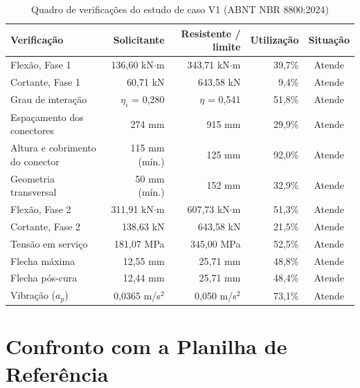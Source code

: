 \begin{table}[htbp]
  \centering
  \caption{Quadro de verificações do estudo de caso V1 (ABNT NBR 8800:2024)}\label{tab:quadro-v1}
  {\small
  \begin{tabular}{@{}lrrrc@{}}
  \toprule
  Verificação & Solicitante & Resistente / limite & Utilização & Situação \\
  \midrule
  Flexão, Fase 1 & 136,60 kN\ensuremath{\cdot}m & 343,71 kN\ensuremath{\cdot}m & 39,7\% & Atende \\
  Cortante, Fase 1 & 60,71 kN & 643,58 kN & 9,4\% & Atende \\
  Grau de interação & $\eta_i$ = 0,280 & $\eta$ = 0,541 & 51,8\% & Atende \\
  Espaçamento dos conectores & 274 mm & 915 mm & 29,9\% & Atende \\
  Altura e cobrimento do conector & 115 mm (mín.) & 125 mm & 92,0\% & Atende \\
  Geometria transversal & 50 mm (mín.) & 152 mm & 32,9\% & Atende \\
  Flexão, Fase 2 & 311,91 kN\ensuremath{\cdot}m & 607,73 kN\ensuremath{\cdot}m & 51,3\% & Atende \\
  Cortante, Fase 2 & 138,63 kN & 643,58 kN & 21,5\% & Atende \\
  Tensão em serviço & 181,07 MPa & 345,00 MPa & 52,5\% & Atende \\
  Flecha máxima & 12,55 mm & 25,71 mm & 48,8\% & Atende \\
  Flecha pós-cura & 12,44 mm & 25,71 mm & 48,4\% & Atende \\
  Vibração ($a_p$) & 0,0365 m/s\ensuremath{^2} & 0,050 m/s\ensuremath{^2} & 73,1\% & Atende \\
  \bottomrule
  \end{tabular}
  }
\end{table}

\section{Confronto com a Planilha de Referência}\label{sec:4.3}

